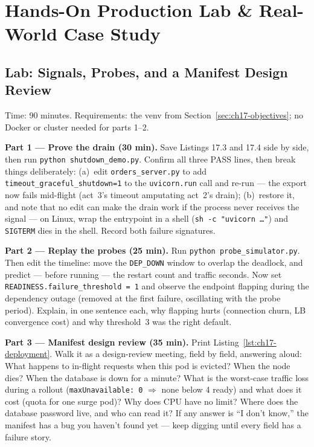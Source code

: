 \section{Hands-On Production Lab \& Real-World Case Study}
\label{sec:ch17-lab}

\subsection{Lab: Signals, Probes, and a Manifest Design Review}
Time: 90 minutes. Requirements: the venv from
Section~\ref{sec:ch17-objectives}; no Docker or cluster needed for parts
1--2.

\textbf{Part 1 --- Prove the drain (30 min).} Save Listings 17.3 and 17.4
side by side, then run \texttt{python shutdown\_demo.py}. Confirm all
three PASS lines, then break things deliberately: (a)~edit
\texttt{orders\_server.py} to add
\texttt{timeout\_graceful\_shutdown=1} to the \texttt{uvicorn.run} call
and re-run --- the export now fails mid-flight (act~3's timeout
amputating act~2's drain); (b)~restore it, and note that no edit can
make the drain work if the process never receives the signal --- on
Linux, wrap the entrypoint in a shell (\texttt{sh -c "uvicorn \ldots"})
and \texttt{SIGTERM} dies in the shell. Record both failure signatures.

\textbf{Part 2 --- Replay the probes (25 min).} Run
\texttt{python probe\_simulator.py}. Then edit the timeline: move the
\texttt{DEP\_DOWN} window to overlap the deadlock, and predict ---
before running --- the restart count and traffic seconds. Now set
\texttt{READINESS.failure\_threshold = 1} and observe the endpoint
flapping during the dependency outage (removed at the first failure,
oscillating with the probe period). Explain, in one sentence each, why
flapping hurts (connection churn, LB convergence cost) and why
threshold~3 was the right default.

\textbf{Part 3 --- Manifest design review (35 min).} Print
Listing~\ref{lst:ch17-deployment}. Walk it as a design-review meeting,
field by field, answering aloud: What happens to in-flight requests when
this pod is evicted? When the node dies? When the database is down for
a minute? What is the worst-case traffic loss during a rollout
(\texttt{maxUnavailable: 0} $\Rightarrow$ none below 4 ready) and what
does it cost (quota for one surge pod)? Why does CPU have no limit?
Where does the database password live, and who can read it? If any
answer is ``I don't know,'' the manifest has a bug you haven't found
yet --- keep digging until every field has a failure story.

